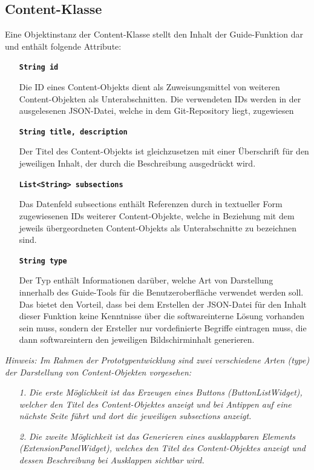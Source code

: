 \documentclass[bibliography=totoc,listof=totoc,BCOR=5mm,DIV=12,oneside]{scrbook}
\begin{document}
\subsection{Content-Klasse}
\par Eine Objektinstanz der Content-Klasse stellt den Inhalt der \grqq Guide\grqq -Funktion dar und enthält folgende Attribute:
\begin{itemize}

\item[] \texttt{\textbf{String id}}
\par Die ID eines Content-Objekts dient als Zuweisungsmittel von weiteren Content-Objekten als Unterabschnitten. Die verwendeten IDs werden in der ausgelesenen JSON-Datei, welche in dem Git-Repository liegt, zugewiesen

\item[] \texttt{\textbf{String title, description}}
\par Der Titel des Content-Objekts ist gleichzusetzen mit einer Überschrift für den jeweiligen Inhalt, der durch die Beschreibung ausgedrückt wird.

\item[] \texttt{\textbf{List<String> subsections}}
\par Das Datenfeld subsections enthält Referenzen durch in textueller Form zugewiesenen IDs weiterer Content-Objekte, welche in Beziehung mit dem jeweils übergeordneten Content-Objekts als Unterabschnitte zu bezeichnen sind.

\item[] \texttt{\textbf{String type}}
\par Der Typ enthält Informationen darüber, welche Art von Darstellung innerhalb des \grqq Guide\grqq -Tools für die Benutzeroberfläche verwendet werden soll. Das bietet den Vorteil, dass bei dem Erstellen der JSON-Datei für den Inhalt dieser Funktion keine Kenntnisse über die softwareinterne Lösung vorhanden sein muss, sondern der Ersteller nur vordefinierte Begriffe eintragen muss, die dann softwareintern den jeweiligen Bildschirminhalt generieren.
\end{itemize}

\par \bigskip \textit{Hinweis: Im Rahmen der Prototypentwicklung sind zwei verschiedene Arten (type) der Darstellung von Content-Objekten vorgesehen:}
\begin{itemize}
\item[\textit{1.}] \textit{Die erste Möglichkeit ist das Erzeugen eines Buttons (\grqq ButtonListWidget\grqq), welcher den Titel des Content-Objektes anzeigt und bei Antippen auf eine nächste Seite führt und dort die jeweiligen subsections anzeigt.}
\item[\textit{2.}] \textit{Die zweite Möglichkeit ist das Generieren eines ausklappbaren Elements (\grqq ExtensionPanelWidget\grqq), welches den Titel des Content-Objektes anzeigt und dessen Beschreibung bei Ausklappen sichtbar wird.}
\end{itemize}
\end{document}

